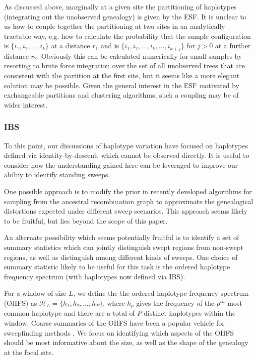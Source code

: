 \documentclass[a4paper,10pt]{article}
\begin{document}
As discussed above, marginally at a given site the partitioning of haplotypes (integrating out the unobserved genealogy) is given by the ESF. It is unclear to us how to couple together the partitioning at two sites in an analytically tractable way, e.g. how to calculate the probability that the sample configuration is $\{i_1,i_2,\dots,i_k\}$ at a distance $r_1$ and is $\{i_1,i_2,\dots,i_k,\dots,i_{k+j}\}$ for $j>0$ at a further distance $r_2$. Obviously this can be calculated numerically for small samples by resorting to brute force integration over the set of all unobserved trees that are consistent with the partition at the first site, but it seems like a more elegant solution may be possible. Given the general interest in the ESF motivated by exchangeable partitions and clustering algorithms, such a coupling may be of wider interest.
 
\subsubsection*{IBS}
To this point, our discussions of haplotype variation have focused on haplotypes defined via identity-by-descent, which cannot be observed directly. It is useful to consider how the understanding gained here can be leveraged to improve our ability to identify standing sweeps. 

One possible approach is to modify the prior in recently developed algorithms for sampling from the ancestral recombination graph \citep[e.g. ARGweaver,][]{Rasmussen:2014gj} to approximate the genealogical distortions expected under different sweep scenarios. This approach seems likely to be fruitful, but lies beyond the scope of this paper.

An alternate possibility which seems potentially fruitful is to identify a set of summary statistics which can jointly distinguish swept regions from non-swept regions, as well as distinguish among different kinds of sweeps. One choice of summary statistic likely to be useful for this task is the ordered haplotype frequency spectrum (with haplotypes now defined via IBS).

For a window of size $L$, we define the the ordered haplotype frequency spectrum (OHFS) as $\mathcal{H}_L = \{h_1,h_2,\dots,h_{P}\}$, where $h_p$ gives the frequency of the $p^{th}$ most common haplotype and there are a total of $P$ distinct haplotypes within the window. Coarse summaries of the OHFS have been a popular vehicle for sweepfinding methods \cite[e.g. EHH, iHS and H12:][]{Sabeti:2002ge,Voight:2006go,Garud:2015jy}. We focus on identifying which aspects of the OHFS should be most informative about the size, as well as the shape of the genealogy at the focal site.
\end{document}
